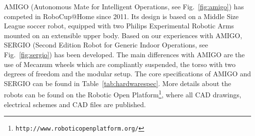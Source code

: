 AMIGO (Autonomous Mate for Intelligent Operations, see Fig.~\ref{fig:amigo}) has competed in RoboCup@Home since 2011. Its design is based on a Middle Size League soccer robot, equipped with two Philips\texttrademark \hspace{0em} Experimental Robotic Arms mounted on an extensible upper body. Based on our experiences with AMIGO, SERGIO (Second Edition Robot for Generic Indoor Operations, see Fig.~\ref{fig:sergio}) has been developed. The main differences with AMIGO are the use of Mecanum wheels which are compliantly suspended, the torso with two degrees of freedom and the modular setup. The core specifications of AMIGO and SERGIO can be found in Table~\ref{tab:hardwarespec}. More details about the robots can be found on the Robotic Open Platform\footnote{\texttt{http://www.roboticopenplatform.org/}}, where all CAD drawings, electrical schemes and CAD files are published.

